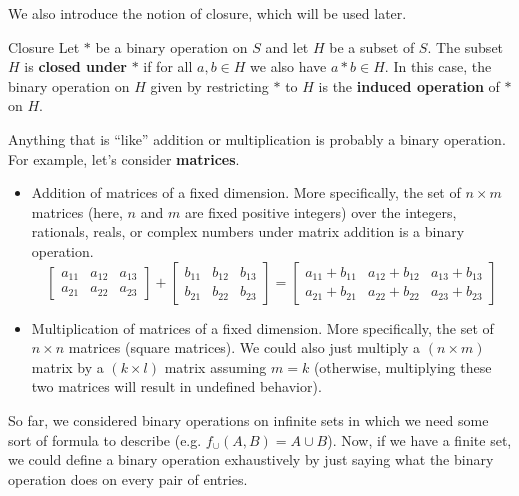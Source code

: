 \documentclass[letterpaper]{article}
\begin{document}
We also introduce the notion of closure, which will be used later. 
\begin{definition}{Closure}{}
    Let $*$ be a binary operation on $S$ and let $H$ be a subset of $S$. The subset $H$ is \textbf{closed under} $*$ if for all $a, b \in H$ we also have $a * b \in H$. In this case, the binary operation on $H$ given by restricting $*$ to $H$ is the \textbf{induced operation} of $*$ on $H$.
\end{definition}

Anything that is ``like'' addition or multiplication is probably a binary operation. For example, let's consider \textbf{matrices}.
\begin{itemize}
    \item Addition of matrices of a fixed dimension. More specifically, the set of $n \times m$ matrices (here, $n$ and $m$ are fixed positive integers) over the integers, rationals, reals, or complex numbers under matrix addition is a binary operation.
    \[
        \begin{bmatrix}
            a_{11} & a_{12} & a_{13} \\ 
            a_{21} & a_{22} & a_{23}
        \end{bmatrix} + \begin{bmatrix}
            b_{11} & b_{12} & b_{13} \\ 
            b_{21} & b_{22} & b_{23}
        \end{bmatrix} = \begin{bmatrix}
            a_{11} + b_{11} & a_{12} + b_{12} & a_{13} + b_{13} \\ 
            a_{21} + b_{21} & a_{22} + b_{22} & a_{23} + b_{23}
        \end{bmatrix}
    \]

    \item Multiplication of matrices of a fixed dimension. More specifically, the set of $n \times n$ matrices (square matrices). We could also just multiply a $(n \times m)$ matrix by a $(k \times l)$ matrix assuming $m = k$ (otherwise, multiplying these two matrices will result in undefined behavior). 
\end{itemize}

So far, we considered binary operations on infinite sets in which we need some sort of formula to describe (e.g. $f_{\cup}(A, B) = A \cup B$). Now, if we have a finite set, we could define a binary operation exhaustively by just saying what the binary operation does on every pair of entries.
\end{document}
